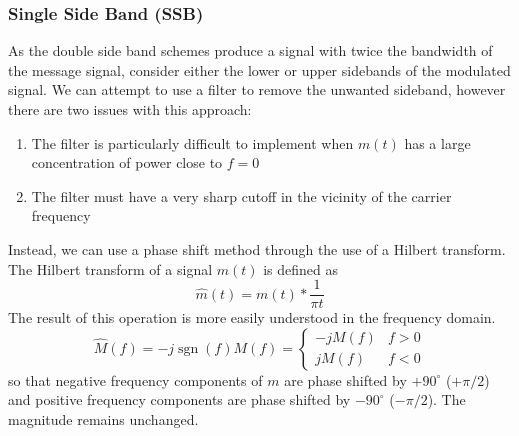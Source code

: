 \documentclass{article}
\DeclareMathOperator{\sgn}{sgn}
\begin{document}
\subsubsection{Single Side Band (SSB)}
As the double side band schemes produce a signal with twice the bandwidth of the message signal, consider either the
lower or upper sidebands of the modulated signal. We can attempt to use a filter to remove the unwanted sideband, however
there are two issues with this approach:
\begin{enumerate}
    \item The filter is particularly difficult to implement when \(m\left( t \right)\) has a large concentration of power close to \(f = 0\)
    \item The filter must have a very sharp cutoff in the vicinity of the carrier frequency
\end{enumerate}
Instead, we can use a phase shift method through the use of a Hilbert transform.
The Hilbert transform of a signal \(m\left( t \right)\) is defined as
\begin{equation*}
    \hat{m}\left( t \right) = m\left( t \right) \ast \frac{1}{\pi t}
\end{equation*}
The result of this operation is more easily understood in the frequency domain.
\begin{equation*}
    \hat{M}\left( f \right) = -j \sgn{\left( f \right)} M\left( f \right) = \begin{cases}
        -j M\left( f \right) & f > 0 \\
        j M\left( f \right)  & f < 0
    \end{cases}
\end{equation*}
so that negative frequency components of \(m\) are phase shifted by \(+90^{\circ}\) (\(+\pi/2\)) and
positive frequency components are phase shifted by \(-90^{\circ}\) (\(-\pi/2\)).
The magnitude remains unchanged.
\end{document}

